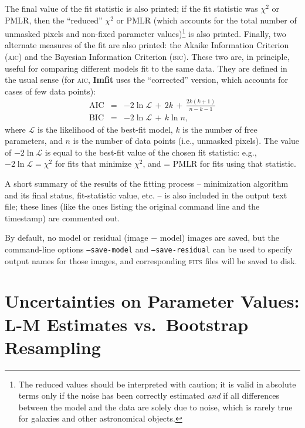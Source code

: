 \documentclass[10pt,a4paper,article]{memoir}
\newcommand{\imfit}{\textbf{Imfit}}
\newcommand{\chisquare}{\ensuremath{\chi^{2}}}
\begin{document}
The final value of the fit statistic is also printed; if the fit
statistic was \chisquare{} or PMLR, then the ``reduced'' $\chi^{2}$ or
PMLR (which accounts for the total number of unmasked pixels and
non-fixed parameter values)\footnote{The reduced values should be
interpreted with caution; it is valid in absolute terms only if the
noise has been correctly estimated \textit{and} if all differences
between the model and the data are solely due to noise, which is rarely
true for galaxies and other astronomical objects.} is also printed.
Finally, two alternate measures of the fit are also printed: the Akaike
Information Criterion (\textsc{aic}) and the Bayesian Information
Criterion (\textsc{bic}). These two are, in principle, useful for
comparing different models fit to the same data. They are defined in the
usual sense (for \textsc{aic}, \imfit{} uses the ``corrected'' version,
which accounts for cases of few data points):
\begin{eqnarray}
\mathrm{AIC} & = & -2 \ln \mathcal{L} \, +\,  2k \, + \, \frac{2k(k + 1)}{n - k - 1} \\
\mathrm{BIC} & = & -2 \ln \mathcal{L} \, + \, k \ln n ,
\end{eqnarray}
where $\mathcal{L}$ is the likelihood of the best-fit model, $k$ is the
number of free parameters, and $n$ is the number of data points (i.e.,
unmasked pixels). The value of $-2 \ln \mathcal{L}$ is equal to the
best-fit value of the chosen fit statistic: e.g., $-2 \ln \mathcal{L} =
\chisquare$ for fits that minimize \chisquare{}, and = PMLR for fits
using that statistic.

A short summary of the results of the fitting process -- minimization
algorithm and its final status, fit-statistic value, etc. -- is also
included in the output text file; these lines (like the ones listing
the original command line and the timestamp) are commented out.

By default, no model or residual (image $-$ model) images are saved, but
the command-line options \texttt{--save-model} and
\texttt{--save-residual} can be used to specify output names for those
images, and corresponding \textsc{fits} files will be saved to disk.



\section{Uncertainties on Parameter Values: L-M Estimates vs.\ Bootstrap Resampling}
\label{sec:bootstrap}
\end{document}
